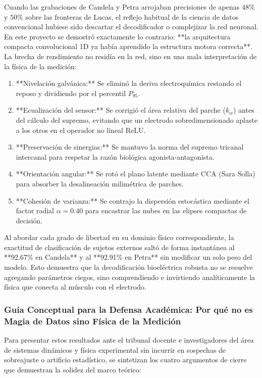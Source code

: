 \documentclass[11pt,a4paper]{article}
\begin{document}
Cuando las grabaciones de Candela y Petra arrojaban precisiones de apenas $48\%$ y $50\%$ sobre las fronteras de Lucas, el reflejo habitual de la ciencia de datos convencional hubiese sido descartar el decodificador o complejizar la red neuronal. En este proyecto se demostró exactamente lo contrario: **la arquitectura compacta convolucional 1D ya había aprendido la estructura motora correcta**. La brecha de rendimiento no residía en la red, sino en una mala interpretación de la física de la medición:
\begin{enumerate}
    \item **Nivelación galvánica:** Se eliminó la deriva electroquímica restando el reposo y dividiendo por el percentil $P_{95}$.
    \item **Ecualización del sensor:** Se corrigió el área relativa del parche ($k_w$) antes del cálculo del supremo, evitando que un electrodo sobredimensionado aplaste a los otros en el operador no lineal $\text{ReLU}$.
    \item **Preservación de sinergias:** Se mantuvo la norma del supremo tricanal intercanal para respetar la razón biológica agonista-antagonista.
    \item **Orientación angular:** Se rotó el plano latente mediante CCA (Sara Solla) para absorber la desalineación milimétrica de parches.
    \item **Cohesión de varianza:** Se contrajo la dispersión estocástica mediante el factor radial $\alpha = 0.40$ para encastrar las nubes en las elipses compactas de decisión.
\end{enumerate}

Al abordar cada grado de libertad en su dominio físico correspondiente, la exactitud de clasificación de sujetos externos saltó de forma instantánea al **92.67\% en Candela** y al **92.91\% en Petra** sin modificar un solo peso del modelo. Esto demuestra que la decodificación bioeléctrica robusta no se resuelve agregando parámetros ciegos, sino comprendiendo e invirtiendo analíticamente la física que conecta al músculo con el electrodo.

\subsubsection{Guía Conceptual para la Defensa Académica: Por qué no es Magia de Datos sino Física de la Medición}
\label{subsubsec:guia_defensa_academica}

Para presentar estos resultados ante el tribunal docente e investigadores del área de sistemas dinámicos y física experimental sin incurrir en sospechas de sobreajuste o artificio estadístico, se sintetizan los cuatro argumentos de cierre que demuestran la solidez del marco teórico:
\end{document}
